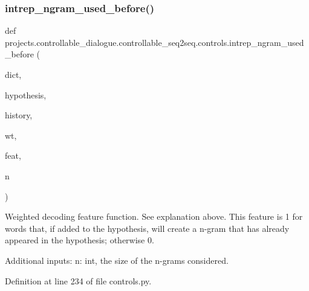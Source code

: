 \subsubsection{\texorpdfstring{intrep\+\_\+ngram\+\_\+used\+\_\+before()}{intrep\_ngram\_used\_before()}}
{\footnotesize\ttfamily def projects.\+controllable\+\_\+dialogue.\+controllable\+\_\+seq2seq.\+controls.\+intrep\+\_\+ngram\+\_\+used\+\_\+before (\begin{DoxyParamCaption}\item[{}]{dict,  }\item[{}]{hypothesis,  }\item[{}]{history,  }\item[{}]{wt,  }\item[{}]{feat,  }\item[{}]{n }\end{DoxyParamCaption})}

\begin{DoxyVerb}Weighted decoding feature function. See explanation above. This feature is 1 for
words that, if added to the hypothesis, will create a n-gram that has already
appeared in the hypothesis; otherwise 0.

Additional inputs:
  n: int, the size of the n-grams considered.
\end{DoxyVerb}
 

Definition at line 234 of file controls.\+py.


